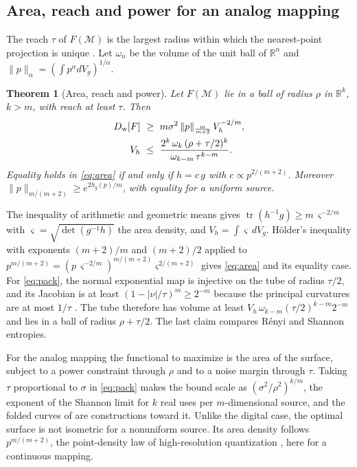 \documentclass[journal]{IEEEtran}
\newtheorem{theorem}{Theorem}
\newcommand{\M}{\mathcal M}
\DeclareMathOperator{\tr}{tr}
\begin{document}
\subsection{Area, reach and power for an analog mapping}
The reach $\tau$ of $F(\M)$ is the largest radius within which the nearest-point projection is unique \cite{federer1959curvature}. Let $\omega_n$ be the volume of the unit ball of $\mathbb R^n$ and $\|p\|_\alpha=(\int p^\alpha dV_g)^{1/\alpha}$.
\begin{theorem}[Area, reach and power]\label{thm:area}
Let $F(\M)$ lie in a ball of radius $\rho$ in $\mathbb R^k$, $k>m$, with reach at least $\tau$. Then
\begin{align}
 D_{\rm w}[F]&\ \ge\ m\sigma^2\,\|p\|_{\frac m{m+2}}\,V_h^{-2/m},\label{eq:area}\\
 V_h&\ \le\ \frac{2^k\,\omega_k\,(\rho+\tau/2)^k}{\omega_{k-m}\,\tau^{k-m}}.\label{eq:pack}
\end{align}
Equality holds in \eqref{eq:area} if and only if $h=c\,g$ with $c\propto p^{2/(m+2)}$. Moreover $\|p\|_{m/(m+2)}\ge e^{2h_g(p)/m}$, with equality for a uniform source.
\end{theorem}
\begin{IEEEproof}
The inequality of arithmetic and geometric means gives $\tr(h^{-1}g)\ge m\,\varsigma^{-2/m}$ with $\varsigma=\sqrt{\det(g^{-1}h)}$ the area density, and $V_h=\int\varsigma\,dV_g$. H\"older's inequality with exponents $(m+2)/m$ and $(m+2)/2$ applied to $p^{m/(m+2)}=(p\,\varsigma^{-2/m})^{m/(m+2)}\varsigma^{2/(m+2)}$ gives \eqref{eq:area} and its equality case. For \eqref{eq:pack}, the normal exponential map is injective on the tube of radius $\tau/2$, and its Jacobian is at least $(1-|\nu|/\tau)^m\ge2^{-m}$ because the principal curvatures are at most $1/\tau$ \cite{gray2004tubes}. The tube therefore has volume at least $V_h\,\omega_{k-m}(\tau/2)^{k-m}2^{-m}$ and lies in a ball of radius $\rho+\tau/2$. The last claim compares R\'enyi and Shannon entropies.
\end{IEEEproof}
For the analog mapping the functional to maximize is the area of the surface, subject to a power constraint through $\rho$ and to a noise margin through $\tau$. Taking $\tau$ proportional to $\sigma$ in \eqref{eq:pack} makes the bound scale as $(\sigma^2/\rho^2)^{k/m}$, the exponent of the Shannon limit for $k$ real uses per $m$-dimensional source, and the folded curves of \cite{hekland2009shannon} are constructions toward it. Unlike the digital case, the optimal surface is not isometric for a nonuniform source. Its area density follows $p^{m/(m+2)}$, the point-density law of high-resolution quantization \cite{iacobelli2016quantization}, here for a continuous mapping.
\end{document}
